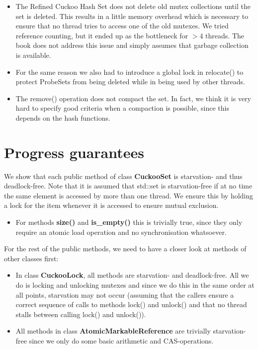 \documentclass[a4paper,10pt]{article}
\begin{document}
\begin{itemize}
\item The Refined Cuckoo Hash Set does not delete old mutex collections until the set is deleted. This results in a little memory overhead which is necessary to ensure that no thread tries to access one of the old mutexes. We tried reference counting, but it ended up as the bottleneck for $>4$ threads. The book does not address this issue and simply assumes that garbage collection is available.
\item For the same reason we also had to introduce a global lock in relocate() to protect ProbeSets from being deleted while in being used by other threads.
\item The remove() operation does not compact the set. In fact, we think it is very hard to specify good criteria when a compaction is possible, since this depends on the hash functions.

\end{itemize}

\section{Progress guarantees}
\label{sec:progressGuarantees}
We show that each public method of class \textbf{CuckooSet} is starvation- and thus deadlock-free. Note that it is assumed that std::set is starvation-free if at no time the same element is accessed by more than one thread. We ensure this by holding a lock for the item whenever it is accessed to ensure mutual exclusion.
\begin{itemize}
\item For methods \textbf{size()} and \textbf{is\_empty()} this is trivially true, since they only require an atomic load operation and no synchronisation 
whatsoever.
\end{itemize}
For the rest of the public methods, we need to have a closer look at methods of other classes first:
\begin{itemize}
\item In class \textbf{CuckooLock}, all methods are starvation- and deadlock-free. All we do is locking and unlocking mutexes and since we do this in the same order at all points, starvation may not occur (assuming that the callers ensure a correct sequence of calls to methods lock() and unlock() and that no thread stalls between calling lock() and unlock()).
\item All methods in class \textbf{AtomicMarkableReference} are trivially starvation-free since we only do some basic arithmetic and CAS-operations.
\end{itemize}
\end{document}
